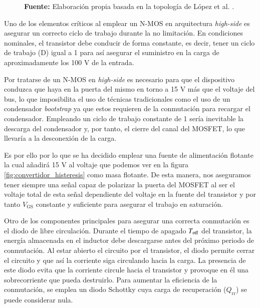 \documentclass[12pt]{report} %
\begin{document}
\begin{figure}[H]
{
    }
    
    \vspace{2mm}
    {\raggedleft \textbf{Fuente:} Elaboración propia basada en la topología de López et al. \cite{lopez_antuna_diseno_2024}. \par}
\end{figure}

Uno de los elementos críticos al emplear un N-MOS en arquitectura \textit{high-side} es asegurar un correcto ciclo de trabajo durante la no limitación. En condiciones nominales, el transistor debe conducir de forma constante, es decir, tener un ciclo de trabajo (D) igual a 1 para así asegurar el suministro en la carga de aproximadamente los 100 V de la entrada. 

Por tratarse de un N-MOS en \textit{high-side} es necesario para que el dispositivo conduzca que haya en la puerta del mismo en torno a 15 V más que el voltaje del bus, lo que imposibilita el uso de técnicas tradicionales como el uso de un condensador \textit{bootstrap} ya que estos requieren de la conmutación para recargar el condensador. Empleando un ciclo de trabajo constante de 1 sería inevitable la descarga del condensador y, por tanto, el cierre del canal del MOSFET, lo que llevaría a la desconexión de la carga. 

Es por ello por lo que se ha decidido emplear una fuente de alimentación flotante la cual añadirá 15 V al voltaje que podemos ver en la figura \ref{fig:convertidor_histeresis} como masa flotante. De esta manera, nos aseguramos tener siempre una señal capaz de polarizar la puerta del MOSFET al ser el voltaje total de esta señal dependiente del voltaje en la fuente del transistor y por tanto $V_\text{GS}$ constante y suficiente para asegurar el trabajo en saturación. 

Otro de los componentes principales para asegurar una correcta conmutación es el diodo de libre circulación. Durante el tiempo de apagado $T_{\text{off}}$ del transistor, la energía almacenada en el inductor debe descargarse antes del próximo periodo de conmutación. Al estar abierto el circuito por el transistor, el diodo permite cerrar el circuito y que así la corriente siga circulando hacia la carga. La presencia de este diodo evita que la corriente circule hacia el transistor y provoque en él una sobrecorriente que pueda destruirlo. Para aumentar la eficiencia de la conmutación, se emplea un diodo Schottky cuya carga de recuperación ($Q_\text{rr}$) se puede considerar nula.
\end{document}
